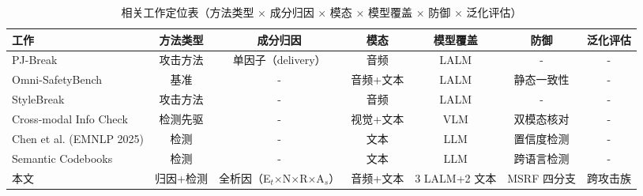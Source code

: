 \begin{table}[htbp]
\centering
\caption{相关工作定位表（方法类型 × 成分归因 × 模态 × 模型覆盖 × 防御 × 泛化评估）}
\label{tab:positioning}
\begin{tabular}{lcccccc}
\hline
工作 & 方法类型 & 成分归因 & 模态 & 模型覆盖 & 防御 & 泛化评估 \\
\hline
PJ-Break & 攻击方法 & 单因子（delivery） & 音频 & LALM & - & - \\
Omni-SafetyBench & 基准 & - & 音频+文本 & LALM & 静态一致性 & - \\
StyleBreak & 攻击方法 & - & 音频 & LALM & - & - \\
Cross-modal Info Check & 检测先驱 & - & 视觉+文本 & VLM & 双模态核对 & - \\
Chen et al. (EMNLP 2025) & 检测 & - & 文本 & LLM & 置信度检测 & - \\
Semantic Codebooks & 检测 & - & 文本 & LLM & 跨语言检测 & - \\
\hline
本文 & 归因+检测 & 全析因（E$_t$$\times$N$\times$R$\times$A$_s$） & 音频+文本 & 3 LALM+2 文本 & MSRF 四分支 & 跨攻击族 \\
\hline
\end{tabular}
\end{table}
